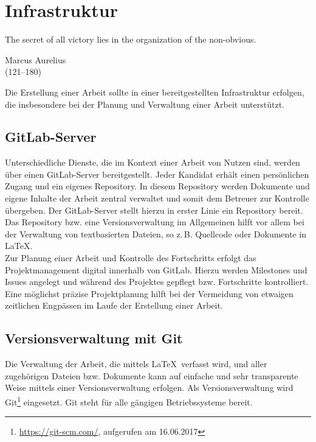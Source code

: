 \chapter{Infrastruktur}
\label{chap:infrastruktur}

\epigraph{\glqq The secret of all victory lies in the organization of the non-obvious.\grqq\bigskip}%
{{Marcus Aurelius}\\ (121--180)}

\noindent
Die Erstellung einer Arbeit sollte in einer bereitgestellten Infrastruktur erfolgen, die insbesondere bei der Planung und Verwaltung einer Arbeit unterstützt.
\indent

\section{GitLab-Server}
\label{gitlab}

Unterschiedliche Dienste, die im Kontext einer Arbeit von Nutzen sind, werden über einen GitLab-Server bereitgestellt. Jeder Kandidat erhält einen
persönlichen Zugang und ein eigenes Repository. In diesem Repository werden Dokumente und eigene Inhalte der Arbeit zentral verwaltet und somit dem
Betreuer zur Kontrolle übergeben. Der GitLab-Server stellt hierzu in erster Linie ein Repository bereit. Das Repository bzw. eine Versionsverwaltung
im Allgemeinen hilft vor allem bei der Verwaltung von textbasierten Dateien, so z.\,B. Quellcode oder Dokumente in \LaTeX .\\

Zur Planung einer Arbeit und Kontrolle des Fortschritts erfolgt das Projektmanagement digital innerhalb von GitLab. Hierzu werden Milestones und Issues
angelegt und während des Projektes gepflegt bzw. Fortschritte kontrolliert. Eine möglichst präzise Projektplanung hilft bei der Vermeidung von etwaigen
zeitlichen Engpässen im Laufe der Erstellung einer Arbeit.

\section{Versionsverwaltung mit Git}

Die Verwaltung der Arbeit, die mittels \LaTeX\ verfasst wird, und aller zugehörigen Dateien bzw. Dokumente kann auf einfache und sehr transparente
Weise mittels einer Versionsverwaltung erfolgen. Als Versionsverwaltung wird Git\footnote{\url{https://git-scm.com/}, aufgerufen am 16.06.2017} eingesetzt.
Git steht für alle gängigen Betriebssysteme bereit.\\


